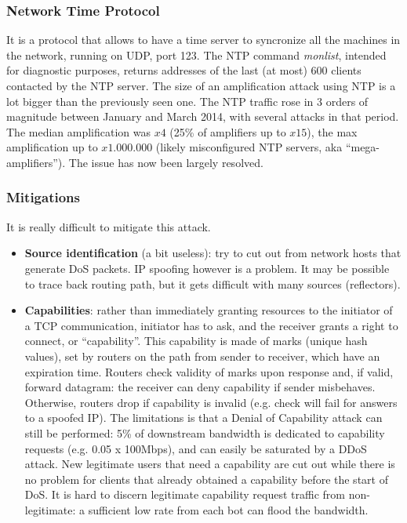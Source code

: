 \documentclass[a4paper, 10pt, titlepage]{article}
\begin{document}
\subsubsection*{Network Time Protocol}
It is a protocol that allows to have a time server to syncronize all the machines in the network, running on UDP, port 123. The NTP command \textit{monlist}, intended for diagnostic purposes, returns addresses of the last (at most) 600 clients contacted by the NTP server. The size of an amplification attack using NTP is a lot bigger than the previously seen one. The NTP traffic rose in 3 orders of magnitude between January and March 2014, with several attacks in that period. The median amplification was $x4$ (25\% of amplifiers up to $x15$), the max amplification up to $x1.000.000$ (likely misconfigured NTP servers, aka “mega-amplifiers”). The issue has now been largely resolved.

\subsubsection*{Mitigations}
It is really difficult to mitigate this attack.
\begin{itemize}
	\item \textbf{Source identification} (a bit useless): try to cut out from network hosts that generate DoS packets. IP spoofing however is a problem. It may be possible to trace back routing path, but it gets difficult with many sources (reflectors).
	\item \textbf{Capabilities}: rather than immediately granting resources to the initiator of a TCP communication, initiator has to ask, and the receiver grants a right to connect, or “capability”. This capability is made of marks (unique hash values), set by routers on the path from sender to receiver, which have an expiration time. Routers check validity of marks upon response and, if valid, forward datagram: the receiver can deny capability if sender misbehaves. Otherwise, routers drop if capability is invalid (e.g. check will fail for answers to a spoofed IP). The limitations is that a Denial of Capability attack can still be performed: 5\% of downstream bandwidth is dedicated to capability requests (e.g. 0.05 x 100Mbps), and can easily be saturated by a DDoS attack. New legitimate users that need a capability are cut out while there is no problem for clients that already obtained a capability before the start of DoS. It is hard to discern legitimate capability request traffic from non-legitimate: a sufficient low rate from each bot can flood the bandwidth.
\end{itemize}
\end{document}
